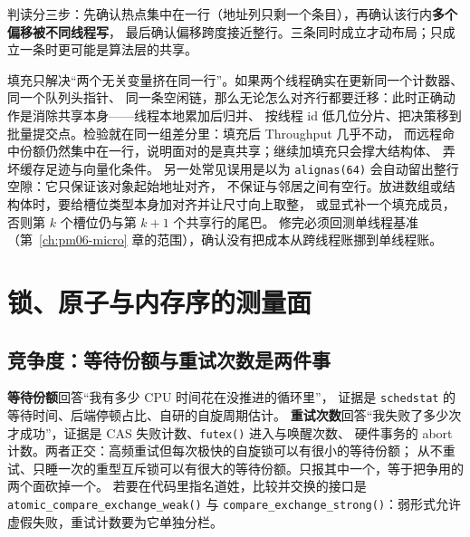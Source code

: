 \documentclass[12pt,a4paper,fontset=fandol]{ctexbook}
\newcommand{\Fn}[1]{\texttt{#1()}}
\newcommand{\Tp}[1]{\texttt{#1}}
\newcommand{\Bk}{\discretionary{}{}{}}
\newcommand{\Lang}[1]{\textsf{#1}}
\newcommand{\MThr}{\Lang{Throughput}}
\begin{document}
判读分三步：先确认热点集中在一行（地址列只剩一个条目），再确认该行内\textbf{多个偏移被不同线程写}，
最后确认偏移跨度接近整行。三条同时成立才动布局；只成立一条时更可能是算法层的共享。

\begin{warning}[title={padding 修不好算法层的共享}]
填充只解决``两个无关变量挤在同一行''。如果两个线程确实在更新同一个计数器、同一个队列头指针、
同一条空闲链，那么无论怎么对齐行都要迁移：此时正确动作是消除共享本身——线程本地累加后归并、
按线程 id 低几位分片、把决策移到批量提交点。检验就在同一组差分里：填充后 \MThr{} 几乎不动，
而远程命中份额仍然集中在一行，说明面对的是真共享；继续加填充只会撑大结构体、
弄坏缓存足迹与向量化条件。
另一处常见误用是以为 \Tp{alignas(64)} 会自动留出整行空隙：它只保证该对象起始地址对齐，
不保证与邻居之间有空行。放进数组或结构体时，要给槽位类型本身加对齐并让尺寸向上取整，
或显式补一个填充成员，否则第 $k$ 个槽位仍与第 $k+1$ 个共享行的尾巴。
修完必须回测单线程基准（第~\ref{ch:pm06-micro} 章的范围），确认没有把成本从跨线程账挪到单线程账。
\end{warning}

\section{锁、原子与内存序的测量面}
\label{sec:pm09-sync}

\subsection{竞争度：等待份额与重试次数是两件事}

\textbf{等待份额}回答``我有多少 CPU 时间花在没推进的循环里''，
证据是 \Tp{schedstat} 的等待时间、后端停顿占比、自研的自旋周期估计。
\textbf{重试次数}回答``我失败了多少次才成功''，证据是 CAS 失败计数、\Fn{futex} 进入与唤醒次数、
硬件事务的 abort 计数。两者正交：高频重试但每次极快的自旋锁可以有很小的等待份额；
从不重试、只睡一次的重型互斥锁可以有很大的等待份额。只报其中一个，等于把争用的两个面砍掉一个。
若要在代码里指名道姓，比较并交换的接口是 \Fn{atomic{\Bk}\_compare{\Bk}\_exchange{\Bk}\_weak}
与 \Fn{compare{\Bk}\_exchange{\Bk}\_strong}：弱形式允许虚假失败，重试计数要为它单独分栏。
\end{document}

